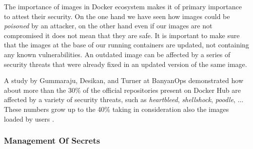 \documentclass[a4paper,12pt]{article}
\begin{document}
The importance of images in Docker ecosystem makes it of primary importance to
attest their security. On the one hand we have seen how images could be
\textit{poisoned} by an attacker, on the other hand even if our images are not
compromised it does not mean that they are safe. It is important to make
sure that the images at the base of our running containers are updated, not
containing any known vulnerabilities.  An outdated image can be affected by a
series of security threats that were already fixed in an updated version of the
same image. \par A study by Gummaraju, Desikan, and Turner at BanyanOps
demonstrated how about more than the 30\% of the official repositories present
on Docker Hub are affected by a variety of security threats, such as
\textit{heartbleed}, \textit{shellshock}, \textit{poodle}, ... These numbers
grow up to the 40\% taking in consideration also the images loaded by users
\cite{gummaraju_desikan_turner}. 

\subsubsection{Management Of Secrets}
\end{document}
